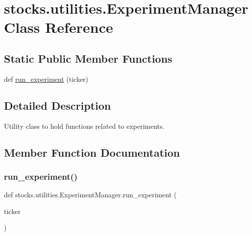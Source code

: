 \hypertarget{classstocks_1_1utilities_1_1_experiment_manager}{}\section{stocks.\+utilities.\+Experiment\+Manager Class Reference}
\label{classstocks_1_1utilities_1_1_experiment_manager}
\subsection*{Static Public Member Functions}
\begin{DoxyCompactItemize}
\item 
def \mbox{\hyperlink{classstocks_1_1utilities_1_1_experiment_manager_a0cddeda4b8d32587b7160be9b33ace52}{run\+\_\+experiment}} (ticker)
\end{DoxyCompactItemize}


\subsection{Detailed Description}
\begin{DoxyVerb}Utility class to hold functions related to experiments.
\end{DoxyVerb}
 

\subsection{Member Function Documentation}
\mbox{\label{classstocks_1_1utilities_1_1_experiment_manager_a0cddeda4b8d32587b7160be9b33ace52}} 
\subsubsection{\texorpdfstring{run\+\_\+experiment()}{run\_experiment()}}
{\footnotesize\ttfamily def stocks.\+utilities.\+Experiment\+Manager.\+run\+\_\+experiment (\begin{DoxyParamCaption}\item[{}]{ticker }\end{DoxyParamCaption})\hspace{0.3cm}{\ttfamily [static]}}


